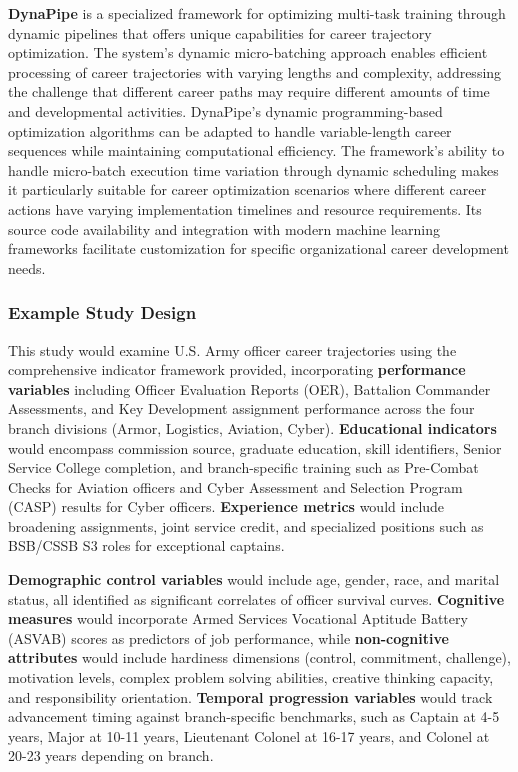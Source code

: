\documentclass[main.tex]{subfiles}
\begin{document}
\textbf{DynaPipe} is a specialized framework for optimizing multi-task training through dynamic pipelines that offers unique capabilities for career trajectory optimization\parencite{dynapipe_amazon,dynapipe_arxiv}. The system's dynamic micro-batching approach enables efficient processing of career trajectories with varying lengths and complexity, addressing the challenge that different career paths may require different amounts of time and developmental activities. DynaPipe's dynamic programming-based optimization algorithms can be adapted to handle variable-length career sequences while maintaining computational efficiency. The framework's ability to handle micro-batch execution time variation through dynamic scheduling makes it particularly suitable for career optimization scenarios where different career actions have varying implementation timelines and resource requirements. Its source code availability and integration with modern machine learning frameworks facilitate customization for specific organizational career development needs.

\subsubsection{Example Study Design}


This study would examine U.S. Army officer career trajectories using the comprehensive indicator framework provided, incorporating \textbf{performance variables} including Officer Evaluation Reports (OER), Battalion Commander Assessments, and Key Development assignment performance across the four branch divisions (Armor, Logistics, Aviation, Cyber)\parencite{army_indicators}. \textbf{Educational indicators} would encompass commission source, graduate education, skill identifiers, Senior Service College completion, and branch-specific training such as Pre-Combat Checks for Aviation officers and Cyber Assessment and Selection Program (CASP) results for Cyber officers\parencite{army_indicators}. \textbf{Experience metrics} would include broadening assignments, joint service credit, and specialized positions such as BSB/CSSB S3 roles for exceptional captains\parencite{army_indicators}.

\textbf{Demographic control variables} would include age, gender, race, and marital status, all identified as significant correlates of officer survival curves\parencite{army_indicators}. \textbf{Cognitive measures} would incorporate Armed Services Vocational Aptitude Battery (ASVAB) scores as predictors of job performance, while \textbf{non-cognitive attributes} would include hardiness dimensions (control, commitment, challenge), motivation levels, complex problem solving abilities, creative thinking capacity, and responsibility orientation\parencite{army_indicators}. \textbf{Temporal progression variables} would track advancement timing against branch-specific benchmarks, such as Captain at 4-5 years, Major at 10-11 years, Lieutenant Colonel at 16-17 years, and Colonel at 20-23 years depending on branch\parencite{army_indicators}.
\end{document}
